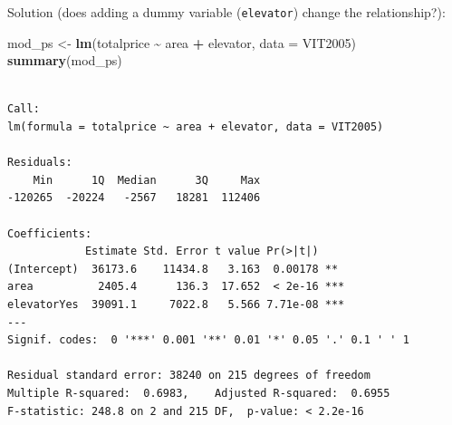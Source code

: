 \documentclass[
  ignorenonframetext,
]{beamer}
\newenvironment{Shaded}{\begin{snugshade}}{\end{snugshade}}
\newcommand{\AttributeTok}[1]{\textcolor[rgb]{0.13,0.29,0.53}{#1}}
\newcommand{\FunctionTok}[1]{\textcolor[rgb]{0.13,0.29,0.53}{\textbf{#1}}}
\newcommand{\NormalTok}[1]{#1}
\newcommand{\OtherTok}[1]{\textcolor[rgb]{0.56,0.35,0.01}{#1}}
\newcommand{\SpecialCharTok}[1]{\textcolor[rgb]{0.81,0.36,0.00}{\textbf{#1}}}
\begin{document}
\begin{frame}[fragile]{Solution (does adding a dummy variable
(\texttt{elevator}) change the relationship?):}
\protect\hypertarget{solution-does-adding-a-dummy-variable-elevator-change-the-relationship-2}{}
\scriptsize

\begin{Shaded}
\begin{Highlighting}[]
\NormalTok{mod\_ps }\OtherTok{\textless{}{-}} \FunctionTok{lm}\NormalTok{(totalprice }\SpecialCharTok{\textasciitilde{}}\NormalTok{ area }\SpecialCharTok{+}\NormalTok{ elevator, }\AttributeTok{data =}\NormalTok{ VIT2005)}
\FunctionTok{summary}\NormalTok{(mod\_ps)}
\end{Highlighting}
\end{Shaded}

\begin{verbatim}

Call:
lm(formula = totalprice ~ area + elevator, data = VIT2005)

Residuals:
    Min      1Q  Median      3Q     Max 
-120265  -20224   -2567   18281  112406 

Coefficients:
            Estimate Std. Error t value Pr(>|t|)    
(Intercept)  36173.6    11434.8   3.163  0.00178 ** 
area          2405.4      136.3  17.652  < 2e-16 ***
elevatorYes  39091.1     7022.8   5.566 7.71e-08 ***
---
Signif. codes:  0 '***' 0.001 '**' 0.01 '*' 0.05 '.' 0.1 ' ' 1

Residual standard error: 38240 on 215 degrees of freedom
Multiple R-squared:  0.6983,    Adjusted R-squared:  0.6955 
F-statistic: 248.8 on 2 and 215 DF,  p-value: < 2.2e-16
\end{verbatim}

\normalsize
\end{frame}
\end{document}
